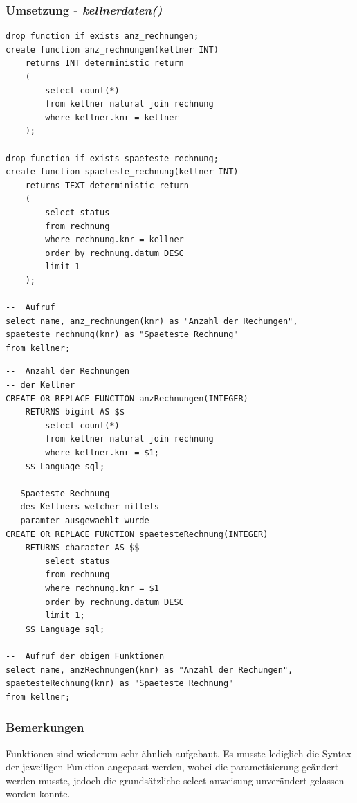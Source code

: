 \subsubsection{Umsetzung - \textit{kellnerdaten()}}
\vspace{0.3cm}
\begin{minipage}{.5\textwidth}
	\begin{lstlisting}[style=sql1, caption={kellnerdaten() - MySQL}]
drop function if exists anz_rechnungen;
create function anz_rechnungen(kellner INT)
	returns INT deterministic return
	(
		select count(*)
		from kellner natural join rechnung
		where kellner.knr = kellner
	);

drop function if exists spaeteste_rechnung;
create function spaeteste_rechnung(kellner INT)
	returns TEXT deterministic return
	(
		select status
		from rechnung
		where rechnung.knr = kellner
		order by rechnung.datum DESC
		limit 1
	);	
	
--	Aufruf
select name, anz_rechnungen(knr) as "Anzahl der Rechungen", spaeteste_rechnung(knr) as "Spaeteste Rechnung"
from kellner;
\end{lstlisting}
\end{minipage}%
\begin{minipage}{.5\textwidth}
	\begin{lstlisting}[style=sql, caption={kellnerdaten() - PSQL}]
--	Anzahl der Rechnungen
-- der Kellner
CREATE OR REPLACE FUNCTION anzRechnungen(INTEGER)
	RETURNS bigint AS $$
		select count(*)
		from kellner natural join rechnung
		where kellner.knr = $1;
	$$ Language sql;

-- Spaeteste Rechnung
-- des Kellners welcher mittels
-- paramter ausgewaehlt wurde
CREATE OR REPLACE FUNCTION spaetesteRechnung(INTEGER)
	RETURNS character AS $$
		select status
		from rechnung
		where rechnung.knr = $1
		order by rechnung.datum DESC
		limit 1;
	$$ Language sql;

--	Aufruf der obigen Funktionen
select name, anzRechnungen(knr) as "Anzahl der Rechungen", spaetesteRechnung(knr) as "Spaeteste Rechnung"
from kellner;
	\end{lstlisting}
\end{minipage}

\subsubsection{Bemerkungen}
Funktionen sind wiederum sehr ähnlich aufgebaut.
Es musste lediglich die Syntax der jeweiligen Funktion angepasst werden, wobei die parametisierung geändert werden musste, jedoch die grundsätzliche select anweisung unverändert gelassen worden konnte. 

